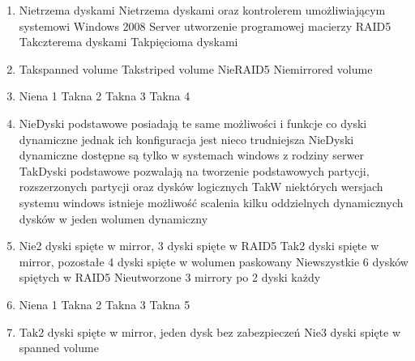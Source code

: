 \begin{enumerate}
		\item {}%
		{Nie}{trzema dyskami}%
		{Nie}{trzema dyskami oraz kontrolerem umożliwiającym systemowi Windows 2008 Server utworzenie programowej macierzy RAID5}
		{Tak}{czterema dyskami}%
		{Tak}{pięcioma dyskami}%
		\newpage
		\item {}%
		{Tak}{spanned volume}%
		{Tak}{striped volume}%
		{Nie}{RAID5}%
		{Nie}{mirrored volume}
		\item {}%
		{Nie}{na 1}%
		{Tak}{na 2}%
		{Tak}{na 3}%
		{Tak}{na 4}
		\item {}%
		{Nie}{Dyski podstawowe posiadają te same możliwości i funkcje co dyski dynamiczne jednak ich konfiguracja jest nieco trudniejsza}%
		{Nie}{Dyski dynamiczne dostępne są tylko w systemach windows z rodziny serwer}%
		{Tak}{Dyski podstawowe pozwalają na tworzenie podstawowych partycji, rozszerzonych partycji oraz dysków logicznych}%
		{Tak}{W niektórych wersjach systemu windows istnieje możliwość scalenia kilku oddzielnych dynamicznych dysków w jeden wolumen dynamiczny}
		\item {}%
		{Nie}{2 dyski spięte w mirror, 3 dyski spięte w RAID5}%
		{Tak}{2 dyski spięte w mirror, pozostałe 4 dyski spięte w wolumen paskowany}%
		{Nie}{wszystkie 6 dysków spiętych w RAID5}%
		{Nie}{utworzone 3 mirrory po 2 dyski każdy}
		\item {}%
		{Nie}{na 1}%
		{Tak}{na 2}%
		{Tak}{na 3}%
		{Tak}{na 5}
		\item {}%
		{Tak}{2 dyski spięte w mirror, jeden dysk bez zabezpieczeń}%
		{Nie}{3 dyski spięte w spanned volume}%

\end{enumerate}
